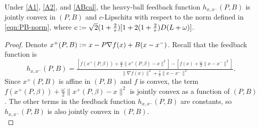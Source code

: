 \begin{lem} \label{lem:heavyball-feedback-property}
Under \ref{A1}, \ref{A2}, and \ref{ABcal}, the heavy-ball feedback function $h_{x, x^{-}}(P, B)$ is jointly convex in $(P, B)$ and $c$-Lipschitz with respect to the norm defined in \eqref{eqn:PB-norm}, where $c := \sqrt{2} (1+\tfrac{2}{\tau}) [1 + 2(1+\tfrac{2}{\tau}) D (L+\omega)]$.
\end{lem}
\begin{proof}
Denote $x^{+}(P, B) := x - P \nabla f(x) + B (x - x^{-})$. 
Recall that the feedback function is
\begin{equation*}
h_{x, x^{-}}(P, B) = \tfrac{[f (x^+(P, \beta)) + \frac{\omega}{2} \| x^+(P, \beta) - x \|^2] - [f (x) + \frac{\omega}{2} \| x - x^- \|^2]}{\| \nabla f (x) \|^2 + \frac{\tau}{2} \| x - x^- \|^2}.
\end{equation*}
Since $x^{+}(P, B)$ is affine in $(P, B)$ and $f$ is convex, the term $f (x^+(P, \beta)) + \frac{\omega}{2} \| x^+(P, \beta) - x \|^2$ is jointly convex as a function of $(P, B)$. The other terms in the feedback function $h_{x, x^{-}}(P, B)$ are constants, so $h_{x, x^{-}}(P, B)$ is also jointly convex in $(P, B)$.\\


\end{proof}
